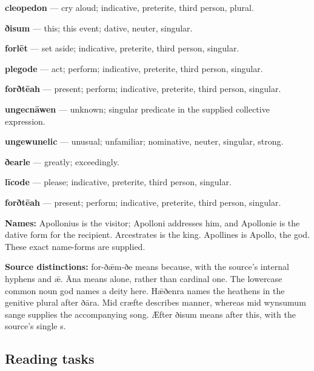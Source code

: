 \textbf{cleopedon} — cry aloud; indicative, preterite, third person, plural.

\textbf{ðisum} — this; this event; dative, neuter, singular.

\textbf{forlēt} — set aside; indicative, preterite, third person, singular.

\textbf{plegode} — act; perform; indicative, preterite, third person, singular.

\textbf{forðtēah} — present; perform; indicative, preterite, third person, singular.

\textbf{ungecnāwen} — unknown; singular predicate in the supplied collective expression.

\textbf{ungewunelic} — unusual; unfamiliar; nominative, neuter, singular, strong.

\textbf{ðearle} — greatly; exceedingly.

\textbf{līcode} — please; indicative, preterite, third person, singular.

\textbf{forðtēah} — present; perform; indicative, preterite, third person, singular.

\textbf{Names:} Apollonius is the visitor; Apolloni addresses him, and Apollonie is the dative form for the recipient. Arcestrates is the king. Apollines is Apollo, the god. These exact name-forms are supplied.

\textbf{Source distinctions:} for-ðǣm-ðe means because, with the source’s internal hyphens and ǣ. Āna means alone, rather than cardinal one. The lowercase common noun god names a deity here. Hǣðenra names the heathens in the genitive plural after ðāra. Mid cræfte describes manner, whereas mid wynsumum sange supplies the accompanying song. Æfter ðisum means after this, with the source’s single s.

\subsection*{Reading tasks}

